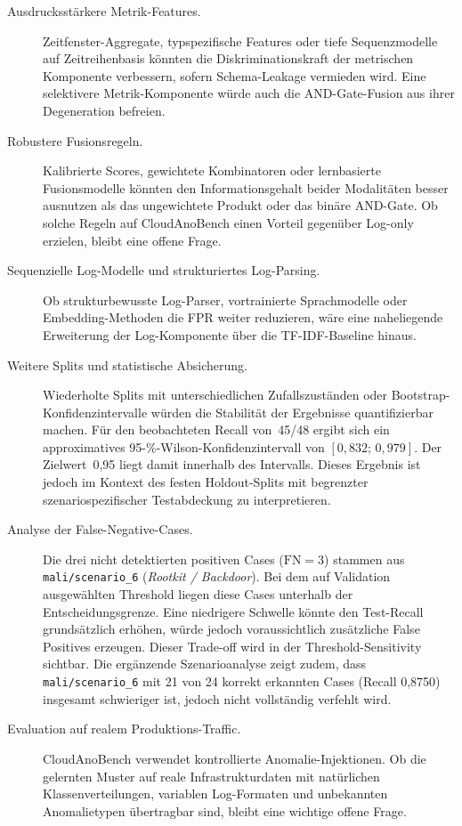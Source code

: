 \begin{description}
  \item[Ausdrucksstärkere Metrik-Features.]
    Zeitfenster-Aggregate, typspezifische Features oder tiefe Sequenzmodelle
    auf Zeitreihenbasis könnten die Diskriminationskraft der metrischen
    Komponente verbessern, sofern Schema-Leakage vermieden wird. Eine
    selektivere Metrik-Komponente würde auch die AND-Gate-Fusion aus ihrer
    Degeneration befreien.

  \item[Robustere Fusionsregeln.]
    Kalibrierte Scores, gewichtete Kombinatoren oder lernbasierte
    Fusionsmodelle könnten den Informationsgehalt beider Modalitäten besser
    ausnutzen als das ungewichtete Produkt oder das binäre AND-Gate. Ob
    solche Regeln auf CloudAnoBench einen Vorteil gegenüber Log-only erzielen,
    bleibt eine offene Frage.

  \item[Sequenzielle Log-Modelle und strukturiertes Log-Parsing.]
    Ob strukturbewusste\hfil\break
    Log-Parser, vortrainierte Sprachmodelle oder
    Embedding-Methoden die FPR weiter reduzieren, wäre eine naheliegende
    Erweiterung der Log-Komponente über die TF-IDF-Baseline hinaus.

  \item[Weitere Splits und statistische Absicherung.]
    Wiederholte Splits mit unterschiedlichen Zufallszuständen oder
    Bootstrap-Konfidenzintervalle würden die Stabilität der Ergebnisse
    quantifizierbar machen. Für den beobachteten Recall von~45/48 ergibt sich
    ein approximatives 95-\%-Wilson-Konfidenzintervall von
    $[0{,}832;\,0{,}979]$. Der Zielwert~0{,}95 liegt damit innerhalb des
    Intervalls. Dieses Ergebnis ist jedoch im Kontext des festen Holdout-Splits
    mit begrenzter szenariospezifischer Testabdeckung zu interpretieren.

  \item[Analyse der False-Negative-Cases.]
    Die drei nicht detektierten positiven Cases ($\text{FN}=3$) stammen aus \texttt{mali/scenario\_6} (\emph{Rootkit / Backdoor}). Bei dem auf Validation ausgewählten Threshold liegen diese Cases unterhalb der Entscheidungsgrenze. Eine niedrigere Schwelle könnte den Test-Recall grundsätzlich erhöhen, würde jedoch voraussichtlich zusätzliche False Positives erzeugen. Dieser Trade-off wird in der Threshold-Sensitivity sichtbar. Die ergänzende Szenarioanalyse zeigt zudem, dass \texttt{mali/scenario\_6} mit 21 von 24 korrekt erkannten Cases (Recall 0{,}8750) insgesamt schwieriger ist, jedoch nicht vollständig verfehlt wird.

  \item[Evaluation auf realem Produktions-Traffic.]
    CloudAnoBench verwendet kontrollierte Anomalie-Injektionen. Ob die
    gelernten Muster auf reale Infrastrukturdaten mit natürlichen
    Klassenverteilungen, variablen Log-Formaten und unbekannten
    Anomalietypen übertragbar sind, bleibt eine wichtige offene Frage.
\end{description}

